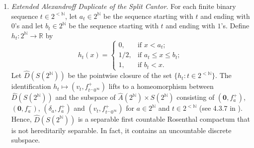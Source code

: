 \begin{example}
\begin{enumerate}
Another way to present this space is as the space $K\times\{0,1\}$ with the identifications
$(a,0)\mapsto g_a^0$ and $(a,1)\mapsto g_a^1$ and the
basic open neighbourhoods are given asabove.
We can also embed $\mathrm{D}(K)$ into the product $A(K)\times K$ by identifying $(a,0)\mapsto (\mathbf{0},a)$ and $(a,1)\mapsto (\delta_a,a)$.

Notice that $\mathrm{D}(K)$ is a first countable Rosenthal compactum.
It is not separable if $K$ is uncountable; thus, we typically study the interesting case when $K=2^\mathbb{N}$.

As with the Alexandroff compactification $A(2^{\mathbb{N}})$, we can make the space $\mathrm{D}(2^{\mathbb{N}})$ separable  by ``softening'' the neighbourhoods of each point through the addition of a countable set.
For example, the closure of the set $\{(v_s,s^\frown 0^\infty):s\in 2^{<\mathbb{N}}\}\subseteq \hat{A}(2^{\mathbb{N}})\times 2^{\mathbb{N}}$ is $\{(\mathbf{0},a):a\in 2^{\mathbb{N}}\}\cup \{(\delta_a,a):a\in 2^{\mathbb{N}}\}\cup\{(v_s,s^\frown 0^\infty):s\in 2^{<\mathbb{N}}\}$, where $\{(\mathbf{0},a):a\in 2^{\mathbb{N}}\}\cup \{(\delta_a,a):a\in 2^{\mathbb{N}}\}$ is homeomorphic to $\mathrm{D}(2^{\mathbb{N}})$.

    \item \emph{Extended Alexandroff Duplicate of the Split Cantor}.
    For each finite binary sequence $t\in 2^{<\mathbb{N}}$, let $a_t\in 2^\mathbb{N}$ be the sequence starting with $t$ and ending with $0$'s and let $b_t\in 2^\mathbb{N}$ be the sequence starting with $t$ and ending with $1$'s.
    Define $h_t\colon 2^\mathbb{N}\to\mathbb{R}$ by
    \[
	h_t(x)=\begin{cases}
        0, & \text{if }x<a_t;\\
        1/2, & \text{if }a_t\leq x \leq b_t;\\
        1, & \text{if }b_t<x.
    \end{cases}
    \]
    Let $\hat{D}(S(2^\mathbb{N}))$ be the pointwise closure of the set $\{h_t:t\in 2^{<\mathbb{N}}\}$.
    The identification $h_t\mapsto (v_t,f_{t^\frown 0^\infty}^+)$ lifts to a homeomorphism between $\hat{D}(S(2^\mathbb{N}))$ and the subspace of $\hat{A}(2^\mathbb{N})\times S(2^\mathbb{N})$ consisting of $(\mathbf{0},f_a^+)$, $(\mathbf{0},f_a^-)$, $(\delta_a,f_a^+)$ and $(v_t,f_{t^\frown 0^\infty}^+)$ for $a\in 2^{\mathbb{N}}$ and $t\in 2^{<\mathbb{N}}$ (see 4.3.7 in \cite{argyros2008rosenthal}).
Hence, $\hat{D}(S(2^\mathbb{N}))$ is a separable first countable Rosenthal compactum that is not hereditarily separable.
In fact, it contains an uncountable discrete subspace.
\end{enumerate}

\end{example}

